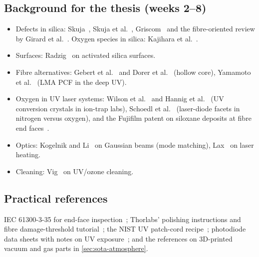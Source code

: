 \subsection*{Background for the thesis (weeks 2--8)}
\begin{itemize}
  \item Defects in silica: Skuja~\cite{Skuja1998}, Skuja et al.~\cite{Skuja2005}, Griscom~\cite{Griscom1991}
        and the fibre-oriented review by Girard et al.~\cite{Girard2019}. Oxygen species in silica:
        Kajihara et al.~\cite{Kajihara2008a}.
  \item Surfaces: Radzig~\cite{Radzig2000} on activated silica surfaces.
  \item Fibre alternatives: Gebert et al.~\cite{Gebert2014} and Dorer et al.~\cite{Dorer2024} (hollow core),
        Yamamoto et al.~\cite{Yamamoto2009} (LMA PCF in the deep UV).
  \item Oxygen in UV laser systems: Wilson et al.~\cite{Wilson2011} and Hannig et al.~\cite{Hannig2018}
        (UV conversion crystals in ion-trap labs), Schoedl et al.~\cite{Schoedl2005} (laser-diode facets in
        nitrogen versus oxygen), and the Fujifilm patent on siloxane deposits at fibre end
        faces~\cite{Fujifilmpatent2006}.
  \item Optics: Kogelnik and Li~\cite{Kogelnik1966} on Gaussian beams (mode matching), Lax~\cite{Lax1977}
        on laser heating.
  \item Cleaning: Vig~\cite{Vig1985} on UV/ozone cleaning.
\end{itemize}

\subsection*{Practical references}
IEC 61300-3-35 for end-face inspection~\cite{IEC61300335}; Thorlabs' polishing instructions and fibre
damage-threshold tutorial~\cite{ThorlabsPolish,ThorlabsDamage}; the NIST UV patch-cord
recipe~\cite{NISTrecipe}; photodiode data sheets with notes on UV exposure~\cite{HamamatsuS1336,HamamatsuS12698};
and the references on 3D-printed vacuum and gas parts in \cref{sec:sota-atmosphere}.
